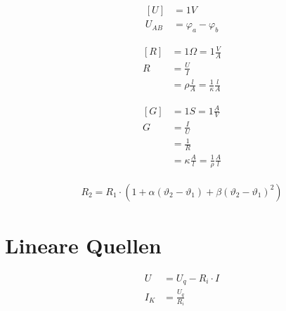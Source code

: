\begin{boxleft}
\end{boxleft}\begin{boxrightshaded}
\begin{align*}
\left[U\right]&=1V\\
U_{AB}&=\varphi_a-\varphi_b
\end{align*}
\end{boxrightshaded}

\begin{boxleft}
\end{boxleft}\begin{boxrightshaded}
\begin{align*}
\left[R\right]&=1\Omega=1\frac{V}{A}\\
R&=\frac{U}{I}\\
&=\rho\frac{l}{A}=\frac{1}{\kappa}\frac{l}{A}
\end{align*}
\end{boxrightshaded}

\begin{boxleft}
\end{boxleft}\begin{boxrightshaded}
\begin{align*}
\left[G\right]&=1S=1\frac{A}{V}\\
G&=\frac{I}{U}\\
&=\frac{1}{R}\\
&=\kappa\frac{A}{l}=\frac{1}{\rho}\frac{A}{l}
\end{align*}
\end{boxrightshaded}

\begin{boxleft}
\end{boxleft}\begin{boxrightshaded}
\begin{align*}
R_2=R_1\cdot\left(1+\alpha\left(\vartheta_2-\vartheta_1\right)+\beta\left(\vartheta_2-\vartheta_1\right)^2\right)
\end{align*}
\end{boxrightshaded}

\section{Lineare Quellen}
\begin{boxleft}
\end{boxleft}\begin{boxrightshaded}
\begin{align*}
U&=U_q-R_i\cdot I\\
I_K&=\frac{U_q}{R_i}
\end{align*}
\end{boxrightshaded}

